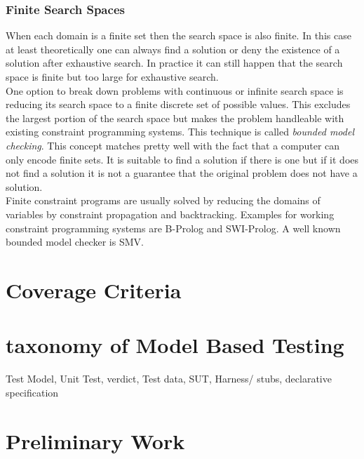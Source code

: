 \subsubsection{Finite Search Spaces}
When each domain is a finite set then the search space is also finite. In this case at least theoretically one can always find a solution or deny the existence of a solution after exhaustive search. In practice it can still happen that the search space is finite but too large for exhaustive search.\\
One option to break down problems with continuous or infinite search space is reducing its search space to a finite discrete set of possible values. This excludes the largest portion of the search space but makes the problem handleable with existing constraint programming systems. This technique is called \emph{bounded model checking}. This concept matches pretty well with the fact that a computer can only encode finite sets. It is suitable to find a solution if there is one but if it does not find a solution it is not a guarantee that the original problem does not have a solution.\\
Finite constraint programs are usually solved by reducing the domains of variables by constraint propagation and backtracking. Examples for working constraint programming systems are B-Prolog and SWI-Prolog\cite{citation needed}. A well known bounded model checker is SMV\cite{citation needed}. 


%

\section{Coverage Criteria}
\section{taxonomy of Model Based Testing}
Test Model,
Unit Test,
verdict,
Test data,
SUT,
Harness/ stubs,
declarative specification

\section{Preliminary Work}
\label{sec:RelatedWork}
